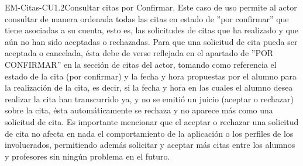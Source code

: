 \begin{UseCase}{EM-Citas-CU1.2}{Consultar citas por Confirmar.}
	{
	\noindent
	Este caso de uso permite al actor consultar de manera ordenada todas las citas en estado de ''por confirmar'' que tiene asociadas a su cuenta, esto es, las solicitudes de citas que ha realizado y que aún no han sido aceptadas o rechazadas. 
	\newline
	Para que una solicitud de cita pueda ser aceptada o cancelada, ésta debe de verse reflejada en el apartado de ''POR CONFIRMAR'' en la sección de citas del actor, tomando como referencia el estado de la cita (por confirmar) y la fecha y hora propuestas por el alumno para la realización de la cita, es decir, si la fecha y hora en las cuales el alumno desea realizar la cita han transcurrido ya, y no se emitió un juicio (aceptar o rechazar) sobre la cita, ésta automáticamente se rechaza y no aparece más como una solicitud de cita. 
	\newline 
	Es importante mencionar que el aceptar o rechazar una solicitud de cita no afecta en nada el comportamiento de la aplicación o los perfiles de los involucrados, permitiendo además solicitar y aceptar más citas entre los alumnos y profesores sin ningún problema en el futuro. 
	\newline
	}
\end{UseCase}

